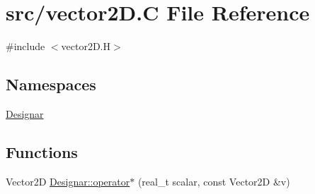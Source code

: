 \hypertarget{vector2_d_8_c}{}\section{src/vector2D.C File Reference}
\label{vector2_d_8_c}
{\ttfamily \#include $<$vector2\+D.\+H$>$}\newline
\subsection*{Namespaces}
\begin{DoxyCompactItemize}
\item 
 \hyperlink{namespace_designar}{Designar}
\end{DoxyCompactItemize}
\subsection*{Functions}
\begin{DoxyCompactItemize}
\item 
Vector2D \hyperlink{namespace_designar_a4b2db2e125d6ac9edf439f63804ba674}{Designar\+::operator$\ast$} (real\+\_\+t scalar, const Vector2D \&v)
\end{DoxyCompactItemize}
